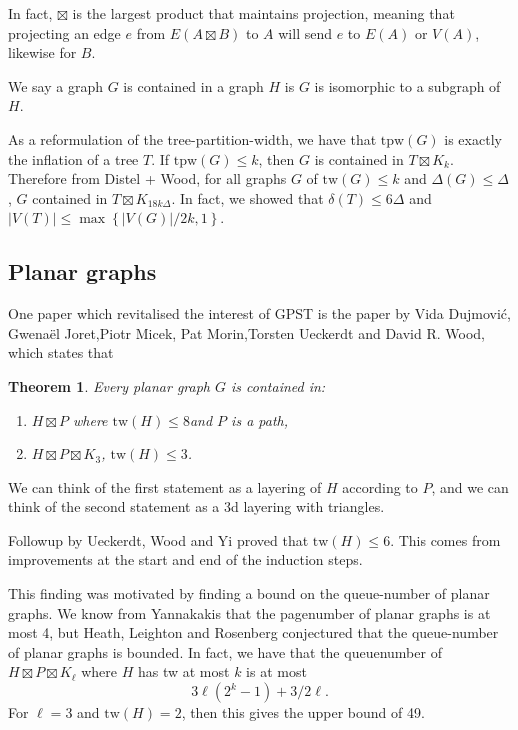 \documentclass[]{article}
\newcommand{\tw}{\text{tw}}
\newcommand{\tpw}{\text{tpw}}
\newtheorem{theorem}{Theorem}
\theoremstyle{definition}
\numberwithin{theorem}{section}
\numberwithin{equation}{section}
\begin{document}
In fact, $\boxtimes$ is the largest product that maintains projection, meaning that projecting an edge $e$ from $E(A \boxtimes B)$ to $A$ will send $e$ to $E(A)$ or $V(A)$, likewise for $B$. 

We say a graph $G$ is contained in a graph $H$ is $G$ is isomorphic to a subgraph of $H$.

As a reformulation of the tree-partition-width, we have that $\tpw(G)$ is exactly the inflation of a tree $T$. If $\tpw(G) \leq k$, then $G$ is contained in $T \boxtimes K_{k}$. Therefore from Distel + Wood, for all graphs $G$ of $\tw(G) \leq k$ and $\Delta(G) \leq \Delta$, $G$ contained in $T \boxtimes K_{18 k \Delta}$. In fact, we showed that $\delta(T) \leq 6 \Delta$ and $|V(T)|  \leq \max \left\{|V(G)|/2k , 1\right\}$.

\subsection{Planar graphs}
One paper which revitalised the interest of GPST is the paper by Vida Dujmović, Gwenaël Joret,Piotr Micek, Pat Morin,Torsten Ueckerdt and David R. Wood, which states that
\begin{theorem}
	Every planar graph $G$ is contained in:
	\begin{enumerate}
		\item $H \boxtimes P$ where $\tw(H) \leq 8$and $P$ is a path,
		\item $H \boxtimes P \boxtimes K_3$, $\tw(H) \leq 3$. 
	\end{enumerate}
\end{theorem}

We can think of the first statement as a layering of $H$ according to $P$, and we can think of the second statement as a 3d layering with triangles.

Followup by Ueckerdt, Wood and Yi proved that $\tw(H) \leq 6$. This comes from improvements at the start and end of the induction steps. 

This finding was motivated by finding a bound on the queue-number of planar graphs. We know from Yannakakis that the pagenumber of planar graphs is at most 4, but Heath, Leighton and Rosenberg conjectured that the queue-number of planar graphs is bounded. In fact, we have that the queuenumber of $H \boxtimes P \boxtimes K_\ell$ where $H$ has tw at most $k$ is at most 
\begin{equation}
	3 \ell (2^k - 1) + 3/2 \ell.
\end{equation}
For $\ell = 3$ and $\tw(H)  = 2$, then this gives the upper bound of 49.
\end{document}
